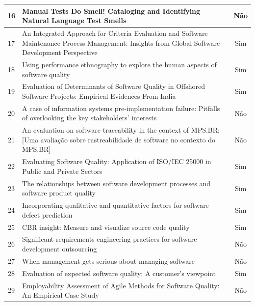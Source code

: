 \begin{longtable}{|c|p{11.5cm}|c|}
    \hline
    16 & Manual Tests Do Smell! Cataloging and Identifying Natural Language Test Smells~\cite{soares2023manual} & Não \\
    \hline
    17 & An Integrated Approach for Criteria Evaluation and Software Maintenance Process Management: Insights from Global Software Development Perspective~\cite{integrated2024maintenance} & Sim \\
    \hline
    18 & Using performance ethnography to explore the human aspects of software quality~\cite{performance2008ethnography} & Sim \\
    \hline
    19 & Evaluation of Determinants of Software Quality in Offshored Software Projects: Empirical Evidences From India~\cite{prabu2020offshore} & Sim \\
    \hline
    20 & A case of information systems pre-implementation failure: Pitfalls of overlooking the key stakeholders' interests~\cite{case2006failure} & Não \\
    \hline
    21 & An evaluation on software traceability in the context of MPS.BR; [Uma avaliação sobre rastreabilidade de software no contexto do MPS.BR]~\cite{mpsbr2021traceability} & Não \\
    \hline
    22 & Evaluating Software Quality: Application of ISO/IEC 25000 in Public and Private Sectors~\cite{iso25000public} & Sim \\
    \hline
    23 & The relationships between software development processes and software product quality~\cite{processes2013quality} & Sim \\
    \hline
    24 & Incorporating qualitative and quantitative factors for software defect prediction~\cite{defect2012prediction} & Sim \\
    \hline
    25 & CBR insight: Measure and visualize source code quality~\cite{cbr2019insight} & Sim \\
    \hline
    26 & Significant requirements engineering practices for software development outsourcing~\cite{iqbal2013requirements} & Não \\
    \hline
    27 & When management gets serious about managing software~\cite{jansma2005management} & Não \\
    \hline
    28 & Evaluation of expected software quality: A customer's viewpoint~\cite{gorski2006evaluation} & Sim \\
    \hline
    29 & Employability Assessment of Agile Methods for Software Quality: An Empirical Case Study~\cite{agile2022employability} & Não \\

\end{longtable}
